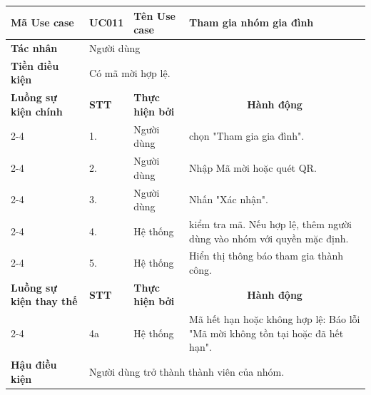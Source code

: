 \begin{longtable}{|p{2.7cm}|p{0.8cm}|p{2.6cm}|p{7.3cm}|}
\hline
\cellcolor[HTML]{D5F5E3}\textbf{Mã Use case} & \multicolumn{1}{l|}{UC011} & \cellcolor[HTML]{D5F5E3}\textbf{Tên Use case} & Tham gia nhóm gia đình \\ \hline
\cellcolor[HTML]{D5F5E3}\textbf{Tác nhân} & \multicolumn{3}{p{10.7cm}|}{Người dùng} \\ \hline
\cellcolor[HTML]{D5F5E3}\textbf{Tiền điều kiện} & \multicolumn{3}{p{10.7cm}|}{Có mã mời hợp lệ.} \\ \hline

\cellcolor[HTML]{D5F5E3}\textbf{Luồng sự kiện chính} & \cellcolor[HTML]{FDEBD0}\textbf{STT} & \cellcolor[HTML]{FDEBD0}\textbf{Thực hiện bởi} & \multicolumn{1}{c|}{\cellcolor[HTML]{FDEBD0}\textbf{Hành động}} \\ \cline{2-4} 
\cellcolor[HTML]{D5F5E3} & 1. & Người dùng & chọn "Tham gia gia đình". \\ \cline{2-4} 
\cellcolor[HTML]{D5F5E3} & 2. & Người dùng & Nhập Mã mời hoặc quét QR. \\ \cline{2-4} 
\cellcolor[HTML]{D5F5E3} & 3. & Người dùng & Nhấn "Xác nhận". \\ \cline{2-4} 
\cellcolor[HTML]{D5F5E3} & 4. & Hệ thống & kiểm tra mã. Nếu hợp lệ, thêm người dùng vào nhóm với quyền mặc định. \\ \cline{2-4} 
\cellcolor[HTML]{D5F5E3} & 5. & Hệ thống & Hiển thị thông báo tham gia thành công. \\ \hline

\cellcolor[HTML]{D5F5E3}\textbf{Luồng sự kiện thay thế} & \cellcolor[HTML]{FDEBD0}\textbf{STT} & \cellcolor[HTML]{FDEBD0}\textbf{Thực hiện bởi} & \multicolumn{1}{c|}{\cellcolor[HTML]{FDEBD0}\textbf{Hành động}} \\ \cline{2-4} 
\cellcolor[HTML]{D5F5E3} & 4a & Hệ thống & Mã hết hạn hoặc không hợp lệ: Báo lỗi "Mã mời không tồn tại hoặc đã hết hạn". \\ \hline

\cellcolor[HTML]{D5F5E3}\textbf{Hậu điều kiện} & \multicolumn{3}{p{10.7cm}|}{Người dùng trở thành thành viên của nhóm.} \\ \hline
\end{longtable}
\endgroup

